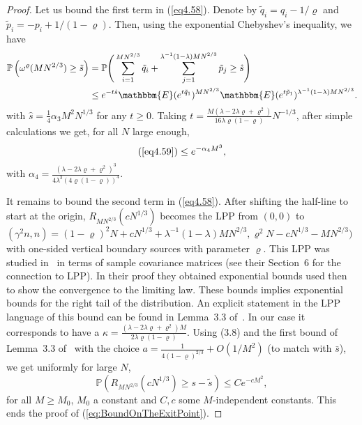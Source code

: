 \documentclass[12pt,a4paper]{article}
\numberwithin{equation}{section}
\newcommand{\Pb}{\mathbb{P}}
\newcommand{\E}{\mathbbm{E}}
\begin{document}
\begin{proof}
Let us bound the first term in (\ref{eq4.58}). Denote by $\tilde q_i=q_i-1/\varrho$ and $\tilde p_i = -p_i+1/(1-\varrho)$. Then, using the exponential Chebyshev's inequality, we have
\begin{equation}\label{eq4.59}
\begin{aligned}
 \Pb\left(\omega^\varrho(M N^{2/3})\geq \tilde s\right) &= \Pb\Bigg(\sum_{i=1}^{M N^{2/3}} \tilde q_i + \sum_{j=1}^{\lambda^{-1}(1-\lambda)M N^{2/3}} \tilde p_j \geq\hat s\Bigg)\\
 &\leq e^{-t\hat s} \E(e^{t\tilde q_1})^{M N^{2/3}} \E(e^{t\tilde p_1})^{\lambda^{-1}(1-\lambda)M N^{2/3}}.
\end{aligned}
\end{equation}
with $\hat s = \frac14 \alpha_3 M^2 N^{1/3}$ for any $t\geq 0$. Taking $t=\frac{M (\lambda-2\lambda\varrho+\varrho^2)}{16\lambda\varrho(1-\varrho)} N^{-1/3}$, after simple calculations we get, for all $N$ large enough,
\begin{equation}
(\ref{eq4.59})\leq e^{-\alpha_4 M^3},
\end{equation}
with $\alpha_4=\frac{(\lambda-2\lambda\varrho+\varrho^2)^3}{4 \lambda^3(4\varrho(1-\varrho))^4}$.

It remains to bound the second term in (\ref{eq4.58}). After shifting the half-line to start at the origin, $R_{MN^{2/3}}(c N^{1/3})$ becomes the LPP from $(0,0)$ to
\mbox{$(\gamma^2 n,n)=(1-\varrho)^2 N+c N^{1/3}+\lambda^{-1}(1-\lambda)MN^{2/3},\varrho^2 N-cN^{1/3}-M N^{2/3})$} with one-sided vertical boundary sources with parameter $\varrho$. This LPP was studied in~\cite{BBP06} in terms of sample covariance matrices (see their Section~6 for the connection to LPP). In their proof they obtained exponential bounds used then to show the convergence to the limiting law. These bounds implies exponential bounds for the right tail of the distribution. An explicit statement in the LPP language of this bound can be found in Lemma~3.3 of~\cite{FO17v1}. In our case it corresponds to have a \mbox{$\kappa=\frac{(\lambda-2\lambda\varrho+\varrho^2)M}{2\lambda\varrho(1-\varrho)}$}. Using (3.8) and the first bound of Lemma~3.3 of~\cite{FO17v1} with the choice $a=\frac{1}{4(1-\varrho)^{2/3}}+O(1/M^2)$ (to match with $\bar s$), we get uniformly for large $N$,
\begin{equation}
\Pb\left(R_{M N^{2/3}}(c N^{1/3})\geq s-\tilde s\right) \leq C e^{-cM^2},
\end{equation}
for all $M\geq M_0$, $M_0$ a constant and $C,c$ some $M$-independent constants. This ends the proof of (\ref{eq:BoundOnTheExitPoint}).
\end{proof}
\end{document}
